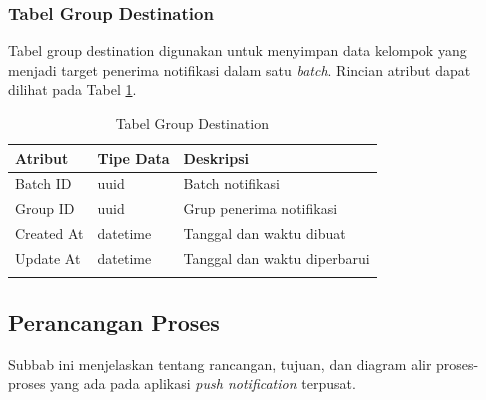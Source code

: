 \subsubsection{Tabel Group Destination}
\par Tabel group destination digunakan untuk menyimpan data kelompok yang menjadi target penerima notifikasi dalam satu \textit{batch}. Rincian atribut dapat dilihat pada Tabel \ref{tabel_group_destination}.
\begin{longtable}{|p{2cm}|p{2.5cm}|p{4.5cm}|}
    \hline
    \textbf{Atribut} & \textbf{Tipe Data} & \textbf{Deskripsi} \\ \hline
    Batch ID & uuid & Batch notifikasi \\ \hline
    Group ID & uuid & Grup penerima notifikasi \\ \hline
    Created At & datetime & Tanggal dan waktu dibuat \\ \hline
    Update At & datetime & Tanggal dan waktu diperbarui \\ \hline
    \caption{Tabel Group Destination}
    \label{tabel_group_destination}
\end{longtable}

\subsection{Perancangan Proses}
\par Subbab ini menjelaskan tentang rancangan, tujuan, dan diagram alir proses-proses yang ada pada aplikasi \textit{push notification} terpusat.

